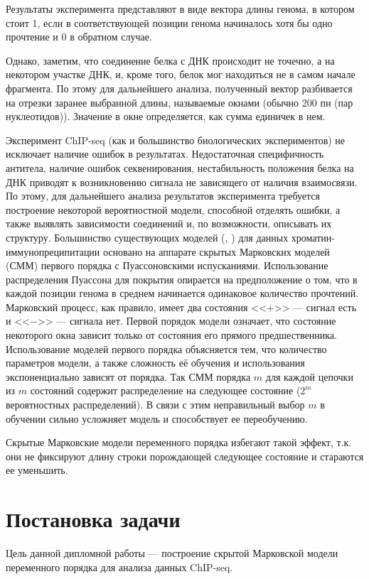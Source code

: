 \documentclass{matmex-diploma-custom}
\begin{document}
Результаты эксперимента представляют в виде вектора длины генома, в котором
стоит 1, если в соответствующей позиции генома начиналось хотя бы одно прочтение
и 0 в обратном случае.

Однако, заметим, что соединение белка с ДНК происходит не точечно, а на некотором участке ДНК, и, кроме того, белок мог находиться не в самом начале фрагмента.
По этому для дальнейшего анализа, полученный вектор разбивается на отрезки заранее выбранной длины, называемые окнами (обычно 200 пн (пар нуклеотидов)). Значение в окне определяется, как сумма единичек в нем. 

Эксперимент ChIP-seq (как и большинство биологических
экспериментов) не исключает наличие ошибок в результатах. Недостаточная специфичность антитела, наличие ошибок секвенирования, нестабильность положения белка на ДНК приводят к возникновению сигнала не
зависящего от наличия взаимосвязи.
По этому, для дальнейшего анализа результатов эксперимента требуется построение некоторой вероятностной модели, способной отделять ошибки, а также 
выявлять зависимости соединений и, по возможности, описывать их структуру.
Большинство существующих моделей (\cite{Zhang2008}, \cite{Spyrou2009}) для данных
хроматин-иммунопреципитации основано на аппарате скрытых Марковских моделей (СММ) \cite{Rabiner1989}
первого порядка с Пуассоновскими испусканиями. Использование распределения
Пуассона для покрытия опирается на предположение о том, что в каждой
позиции генома в среднем начинается одинаковое количество прочтений.
\\Марковский процесс, как правило, имеет два состояния <<$+$>> --- сигнал есть и <<$-$>> --- сигнала нет. Первой порядок модели означает, что состояние некоторого окна зависит только от состояния его прямого предшественника.
Использование моделей первого порядка объясняется тем, что количество параметров
модели, а также сложность её обучения и использования экспоненциально зависят от
порядка. Так СММ порядка $ m $ для каждой цепочки из $ m $ состояний содержит распределение на следующее состояние ($ 2^m $ вероятностных распределений). В связи с этим неправильный выбор $ m $ в обучении сильно усложняет модель и способствует ее переобучению. 

Скрытые Марковские модели переменного порядка избегают такой эффект, т.к. они не фиксируют длину строки порождающей следующее состояние и стараются ее уменьшить.

\section{Постановка задачи}
Цель данной дипломной работы --- построение скрытой Марковской модели переменного
порядка для анализа данных ChIP-seq.
\end{document}
